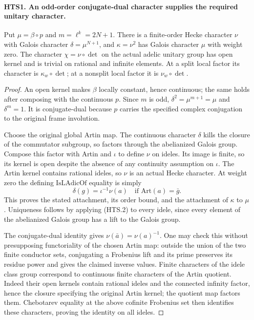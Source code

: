 \paragraph{HTS1. An odd-order conjugate-dual character supplies the required unitary character.}
\label{claim:HTS1}
Put $\mu=\beta\circ p$ and $m=\ell^k=2N+1$.  There is a
finite-order Hecke character $\nu$ with Galois character
$\delta=\mu^{N+1}$, and $\kappa=\nu^2$ has Galois character
$\mu$ with weight zero.  The character
$\chi=\nu\circ\det$ on the actual adelic unitary group has
open kernel and is trivial on rational and infinite elements.
At a split local factor its character is $\kappa_w\circ\det$;
at a nonsplit local factor it is $\nu_w\circ\det$.
\begin{proof}
An open kernel makes $\beta$ locally constant, hence continuous;
the same holds after composing with the continuous $p$.
Since $m$ is odd, $\delta^2=\mu^{m+1}=\mu$ and $\delta^m=1$.
It is conjugate-dual because $p$ carries the specified complex
conjugation to the original frame involution.

Choose the original global Artin map.  The continuous character
$\delta$ kills the closure of the commutator subgroup, so factors
through the abelianized Galois group.  Compose this factor with
Artin and $\iota$ to define $\nu$ on ideles.  Its image is finite,
so its kernel is open despite the absence of any continuity
assumption on $\iota$.  The Artin kernel contains rational
ideles, so $\nu$ is an actual Hecke character.  At weight zero
the defining $\mathrm{IsLAdicOf}$ equality is simply
\[
         \delta(g)=\iota^{-1}\nu(a)
                       \quad\text{if }\mathrm{Art}(a)=\bar g.
                                                               \tag{HTS.2}
\]
This proves the stated attachment, its order bound, and the
attachment of $\kappa$ to $\mu$.  Uniqueness follows by applying
(HTS.2) to every idele, since every element of the abelianized
Galois group has a lift to the Galois group.

The conjugate-dual identity gives $\nu(\bar a)=\nu(a)^{-1}$.
One may check this without presupposing functoriality of the
chosen Artin map: outside the union of the two finite conductor
sets, conjugating a Frobenius lift and its prime preserves its
residue power and gives the claimed inverse values.  Finite
characters of the idele class group correspond to continuous
finite characters of the Artin quotient.  Indeed their open
kernels contain rational ideles and the connected infinity
factor, hence the closure specifying the original Artin kernel;
the quotient map factors them.  Chebotarev equality at the above
cofinite Frobenius set then identifies these characters, proving
the identity on all ideles.


\end{proof}
